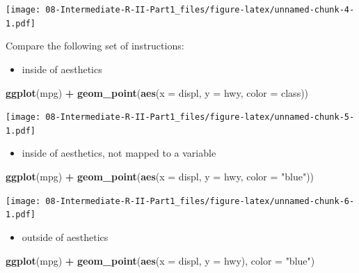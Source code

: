 \documentclass[
]{book}
\newenvironment{Shaded}{\begin{snugshade}}{\end{snugshade}}
\newcommand{\AttributeTok}[1]{\textcolor[rgb]{0.13,0.29,0.53}{#1}}
\newcommand{\FunctionTok}[1]{\textcolor[rgb]{0.13,0.29,0.53}{\textbf{#1}}}
\newcommand{\NormalTok}[1]{#1}
\newcommand{\SpecialCharTok}[1]{\textcolor[rgb]{0.81,0.36,0.00}{\textbf{#1}}}
\newcommand{\StringTok}[1]{\textcolor[rgb]{0.31,0.60,0.02}{#1}}
\providecommand{\tightlist}{%
  \setlength{\itemsep}{0pt}\setlength{\parskip}{0pt}}
\begin{document}
\texttt{[image: 08-Intermediate-R-II-Part1\_files/figure-latex/unnamed-chunk-4-1.pdf]}

Compare the following set of instructions:

\begin{itemize}
\tightlist
\item
  inside of aesthetics
\end{itemize}

\begin{Shaded}
\begin{Highlighting}[]
\FunctionTok{ggplot}\NormalTok{(mpg) }\SpecialCharTok{+} \FunctionTok{geom\_point}\NormalTok{(}\FunctionTok{aes}\NormalTok{(}\AttributeTok{x =}\NormalTok{ displ, }\AttributeTok{y =}\NormalTok{ hwy, }\AttributeTok{color =}\NormalTok{ class))}
\end{Highlighting}
\end{Shaded}

\texttt{[image: 08-Intermediate-R-II-Part1\_files/figure-latex/unnamed-chunk-5-1.pdf]}

\begin{itemize}
\tightlist
\item
  inside of aesthetics, not mapped to a variable
\end{itemize}

\begin{Shaded}
\begin{Highlighting}[]
\FunctionTok{ggplot}\NormalTok{(mpg) }\SpecialCharTok{+} \FunctionTok{geom\_point}\NormalTok{(}\FunctionTok{aes}\NormalTok{(}\AttributeTok{x =}\NormalTok{ displ, }\AttributeTok{y =}\NormalTok{ hwy, }\AttributeTok{color =} \StringTok{"blue"}\NormalTok{))}
\end{Highlighting}
\end{Shaded}

\texttt{[image: 08-Intermediate-R-II-Part1\_files/figure-latex/unnamed-chunk-6-1.pdf]}

\begin{itemize}
\tightlist
\item
  outside of aesthetics
\end{itemize}

\begin{Shaded}
\begin{Highlighting}[]
\FunctionTok{ggplot}\NormalTok{(mpg) }\SpecialCharTok{+} \FunctionTok{geom\_point}\NormalTok{(}\FunctionTok{aes}\NormalTok{(}\AttributeTok{x =}\NormalTok{ displ, }\AttributeTok{y =}\NormalTok{ hwy), }\AttributeTok{color =} \StringTok{"blue"}\NormalTok{)}
\end{Highlighting}
\end{Shaded}
\end{document}
